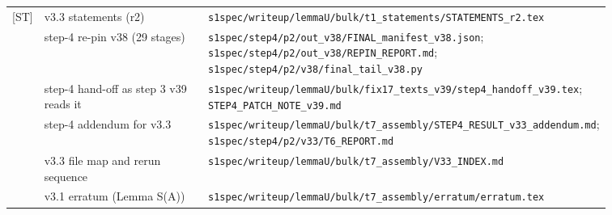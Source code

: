 \documentclass[11pt]{amsart}
\theoremstyle{definition}
\theoremstyle{remark}
\newcommand{\dref}[1]{[\textsf{#1}]}
\newcommand{\pth}[1]{\nolinkurl{#1}}
\begin{document}
\begin{center}
\begin{tabular}{@{}lp{0.30\linewidth}p{0.56\linewidth}@{}}
\dref{ST} & v3.3 statements (r2) & \pth{s1spec/writeup/lemmaU/bulk/t1_statements/STATEMENTS_r2.tex}\\
\dref{R4v38} & step-4 re-pin v38 (29 stages) & \pth{s1spec/step4/p2/out_v38/FINAL_manifest_v38.json}; \pth{s1spec/step4/p2/out_v38/REPIN_REPORT.md}; \pth{s1spec/step4/p2/v38/final_tail_v38.py}\\
\dref{S4H} & step-4 hand-off as step 3 v39 reads it & \pth{s1spec/writeup/lemmaU/bulk/fix17_texts_v39/step4_handoff_v39.tex}; \pth{STEP4_PATCH_NOTE_v39.md}\\
\dref{R4v33} & step-4 addendum for v3.3 & \pth{s1spec/writeup/lemmaU/bulk/t7_assembly/STEP4_RESULT_v33_addendum.md}; \pth{s1spec/step4/p2/v33/T6_REPORT.md}\\
\dref{IDX} & v3.3 file map and rerun sequence & \pth{s1spec/writeup/lemmaU/bulk/t7_assembly/V33_INDEX.md}\\
\dref{ERR} & v3.1 erratum (Lemma S(A)) & \pth{s1spec/writeup/lemmaU/bulk/t7_assembly/erratum/erratum.tex}\\\bottomrule
\end{tabular}\end{center}



\end{document}
